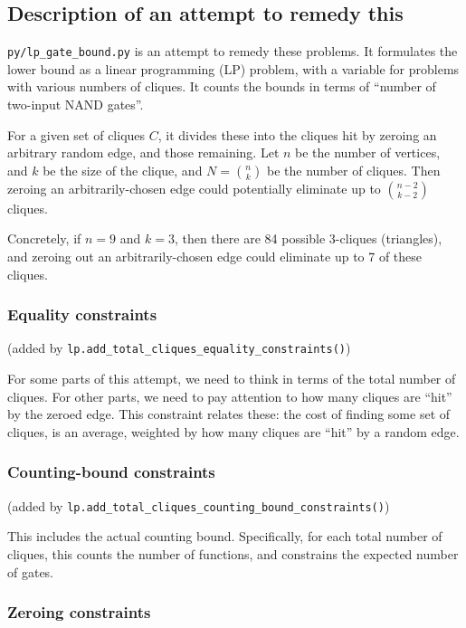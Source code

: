 \documentclass[12pt]{article}
\theoremstyle{definition}
\begin{document}
\subsection{Description of an attempt to remedy this}

{\tt py/lp\_gate\_bound.py} is an attempt to remedy these problems.
It formulates the lower bound as a linear programming (LP) problem,
with a variable for problems with various numbers of cliques.
It counts the bounds in terms of ``number of two-input NAND gates''.

For a given set of cliques $C$, it divides these into the cliques
hit by zeroing an arbitrary random edge, and those remaining.
Let $n$ be the number of vertices, and $k$ be the size of the clique,
and $N = {n \choose k}$ be the number of cliques. Then zeroing
an arbitrarily-chosen edge could potentially eliminate up to
${n-2 \choose k-2}$ cliques.

Concretely, if $n=9$ and $k=3$, then there are 84 possible 3-cliques
(triangles), and zeroing out an arbitrarily-chosen edge could
eliminate up to 7 of these cliques.

\subsubsection{Equality constraints}

(added by {\tt lp.add\_total\_cliques\_equality\_constraints()})

For some parts of this attempt, we need to think in terms of
the total number of cliques. For other parts, we need to pay attention
to how many cliques are ``hit'' by the zeroed edge. This constraint
relates these: the cost of finding some set of cliques, is an
average, weighted by how many cliques are ``hit'' by a random edge.

\subsubsection{Counting-bound constraints}

(added by {\tt lp.add\_total\_cliques\_counting\_bound\_constraints()})

This includes the actual counting bound. Specifically, for
each total number of cliques, this counts the number of functions,
and constrains the expected number of gates.

\subsubsection{Zeroing constraints}
\end{document}
